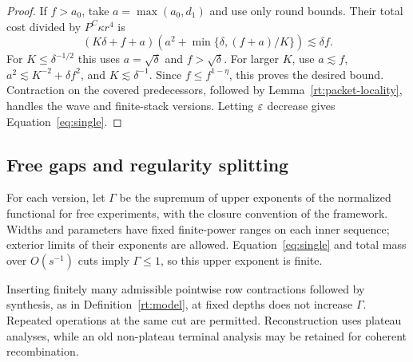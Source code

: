 \begin{proof}
If $f>a_0$, take $a=\max(a_0,d_1)$ and use only round bounds.  Their
total cost divided by $P^C\kappa r^4$ is
\[
 (K\delta+f+a)\left(a^2+\min\{\delta,(f+a)/K\}\right)
 \lesssim\delta f.
\]
For $K\le\delta^{-1/2}$ this uses $a=\sqrt\delta$ and $f>\sqrt\delta$.
For larger $K$, use $a\lesssim f$,
$a^2\lesssim K^{-2}+\delta f^2$, and $K\lesssim\delta^{-1}$.
Since $f\le f^{1-\eta}$, this proves the desired bound.
Contraction on the covered predecessors, followed by Lemma~\ref{rt:packet-locality},
handles the wave and finite-stack versions.  Letting $\varepsilon$ decrease
gives Equation~\eqref{eq:single}.
\end{proof}

\subsection{Free gaps and regularity splitting}

For each version, let $\Gamma$ be the supremum of upper exponents of the
normalized functional for free experiments, with the closure convention
of the framework.  Widths and parameters have fixed finite-power ranges
on each inner sequence; exterior limits of their exponents are allowed.
Equation~\eqref{eq:single} and total mass over $O(s^{-1})$ cuts imply
$\Gamma\le1$, so this upper exponent is finite.

\begin{proposition}\label{rt:free-composition}
Inserting finitely many admissible pointwise row contractions followed
by synthesis, as in Definition~\ref{rt:model}, at fixed depths does not
increase $\Gamma$.  Repeated operations at the same cut are permitted.  Reconstruction
uses plateau analyses, while an old non-plateau terminal analysis may be
retained for coherent recombination.
\end{proposition}

